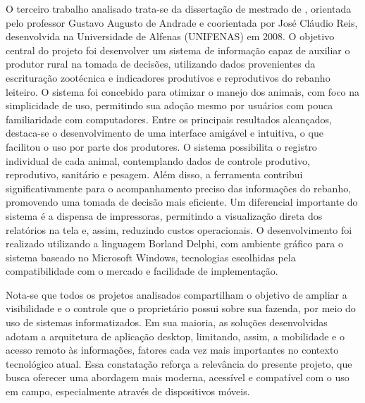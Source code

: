 O terceiro trabalho analisado trata-se da dissertação de mestrado de \cite{Alexandre2008}, orientada pelo professor Gustavo Augusto de Andrade e coorientada por José Cláudio Reis, desenvolvida na Universidade de Alfenas (UNIFENAS) em 2008. O objetivo central do projeto foi desenvolver um sistema de informação capaz de auxiliar o produtor rural na tomada de decisões, utilizando dados provenientes da escrituração zootécnica e indicadores produtivos e reprodutivos do rebanho leiteiro. O sistema foi concebido para otimizar o manejo dos animais, com foco na simplicidade de uso, permitindo sua adoção mesmo por usuários com pouca familiaridade com computadores. Entre os principais resultados alcançados, destaca-se o desenvolvimento de uma interface amigável e intuitiva, o que facilitou o uso por parte dos produtores. O sistema possibilita o registro individual de cada animal, contemplando dados de controle produtivo, reprodutivo, sanitário e pesagem. Além disso, a ferramenta contribui significativamente para o acompanhamento preciso das informações do rebanho, promovendo uma tomada de decisão mais eficiente. Um diferencial importante do sistema é a dispensa de impressoras, permitindo a visualização direta dos relatórios na tela e, assim, reduzindo custos operacionais. O desenvolvimento foi realizado utilizando a linguagem Borland Delphi, com ambiente gráfico para o sistema baseado no Microsoft Windows, tecnologias escolhidas pela compatibilidade com o mercado e facilidade de implementação.

Nota-se que todos os projetos analisados compartilham o objetivo de ampliar a visibilidade e o controle que o proprietário possui sobre sua fazenda, por meio do uso de sistemas informatizados. Em sua maioria, as soluções desenvolvidas adotam a arquitetura de aplicação desktop, limitando, assim, a mobilidade e o acesso remoto às informações, fatores cada vez mais importantes no contexto tecnológico atual. Essa constatação reforça a relevância do presente projeto, que busca oferecer uma abordagem mais moderna, acessível e compatível com o uso em campo, especialmente através de dispositivos móveis.